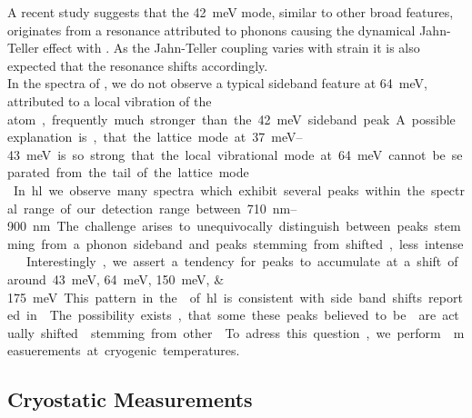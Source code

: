 		A recent study \cite{Londero2016} suggests that the \SI{42}{meV} mode, similar to other broad \psb features, originates from a resonance attributed to phonons causing the dynamical Jahn-Teller effect with \sivs \cite{Fu2009}.
		As the Jahn-Teller coupling varies with strain it is also expected that the resonance shifts accordingly.
		\\
		In the spectra of \vl, we do not observe a typical \siv sideband feature at \SI{64}{meV}, attributed to a local vibration of the \si atom, frequently much stronger than the  \SI{42}{meV} sideband peak.
		A possible explanation is, that the lattice mode at \SIrange{37}{43}{meV} is so strong that the local vibrational mode at \SI{64}{meV} cannot be separated from the tail of the lattice mode.
		\\
		In \hl we observe many spectra which exhibit several peaks within the spectral range of our detection range between \SIrange{710}{900}{nm}.
		The challenge arises to unequivocally distinguish between peaks stemming from a phonon sideband and peaks stemming from shifted, less intense \siv \ZPLs.

		Interestingly, we assert a tendency for peaks to accumulate at a shift of around \SIlist{43;64;150;175}{meV}. This pattern in the \psb of \hl is consistent with side band shifts reported in \cite{Sternschulte1994,Zaitsev2000, Neu2011}.

		The possibility exists, that some these peaks believed to be \psbs are actually shifted \ZPLs stemming from other \sivs. To adress this question, we perform \pl measuerements at cryogenic temperatures.


		\subsection{Cryostatic Measurements}\label{subsec::cryo}

			\begin{figure}[htp]
				\begin{subfigure}[t]{ 0.49\linewidth}
					\centering
					\caption{}
					\label{subfig::roomtep1}
				\end{subfigure}
				\hfill
				\begin{subfigure}[t]{ 0.49\linewidth}
					\centering
					\caption{}
					\label{subfig::cryo}
				\end{subfigure}
				\caption[todo fix figure]{}
				\label{fig::rt_vs_cryo1}
			\end{figure}

